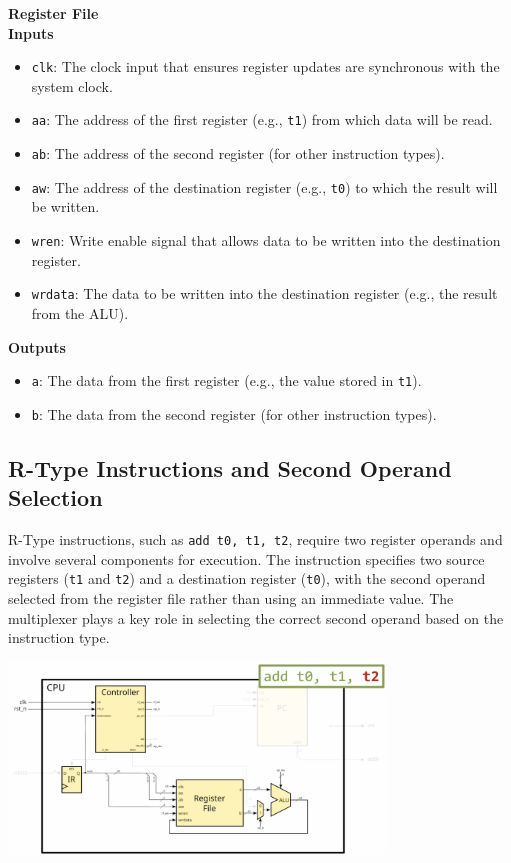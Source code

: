 \begin{minipage}[t]{0.45\textwidth}
    \footnotesize
    \textbf{Register File} \\ \vspace*{5px}
       \textbf{Inputs}
        \begin{itemize}
            \item \texttt{clk}: The clock input that ensures register updates are synchronous with the system clock.
            \item \texttt{aa}: The address of the first register (e.g., \texttt{t1}) from which data will be read.
            \item \texttt{ab}: The address of the second register (for other instruction types).
            \item \texttt{aw}: The address of the destination register (e.g., \texttt{t0}) to which the result will be written.
            \item \texttt{wren}: Write enable signal that allows data to be written into the destination register.
            \item \texttt{wrdata}: The data to be written into the destination register (e.g., the result from the ALU).
        \end{itemize}
        \textbf{Outputs}
        \begin{itemize}
            \item \texttt{a}: The data from the first register (e.g., the value stored in \texttt{t1}).
            \item \texttt{b}: The data from the second register (for other instruction types).
        \end{itemize}

\end{minipage}


\subsection{R-Type Instructions and Second Operand Selection}

R-Type instructions, such as \texttt{add t0, t1, t2}, require two register operands and involve several components for execution. The instruction specifies two source registers (\texttt{t1} and \texttt{t2}) and a destination register (\texttt{t0}), with the second operand selected from the register file rather than using an immediate value. The multiplexer plays a key role in selecting the correct second operand based on the instruction type. \\
\begin{center}
    \includegraphics[width=0.75\textwidth]{chapters/chapter2a/images/p5.png}
\end{center}
\noindent

